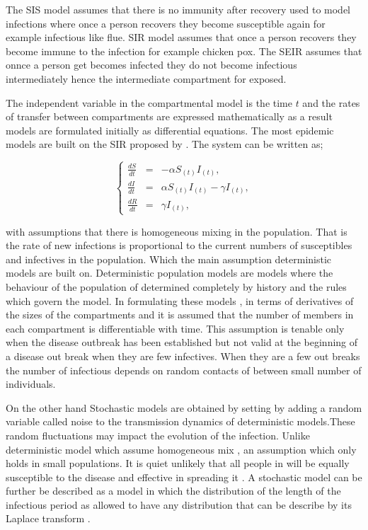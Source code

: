 The SIS model assumes that there is no immunity after recovery used to model infections where once a person recovers they become susceptible again for example infectious like flue. SIR model assumes that once a person recovers they become immune to the infection for example chicken pox. The SEIR assumes that onnce a person get becomes infected they do not  become infectious intermediately hence the intermediate compartment for exposed. 

The independent variable in the compartmental model is the time $t$ and the rates of transfer between compartments are expressed mathematically as a result models are formulated initially as differential equations. The most epidemic models are built on the SIR proposed by \cite{m1925applications}. The system can be written as;


\begin{center}
\begin{equation} \label{eqn1_1}
\left\lbrace \begin{array}{ccl}
\frac{dS}{dt} &= &-\alpha S_{(t)} I_{(t)},\\
 \frac{dI}{dt} &=& \alpha S_{(t)} I_{(t)} - \gamma  I_{(t)}, \\
 \frac{dR}{dt} &= &\gamma  I_{(t)},
\end{array} \right. 
\end{equation}
\end{center}

 with assumptions that there is homogeneous mixing in the population. That is the rate of new infections is proportional to the current numbers of susceptibles and infectives in the population. Which the main assumption deterministic models are built on. Deterministic population  models are models where the behaviour of the population of determined completely by history and the rules which govern the model. In formulating these models , in terms of derivatives of the sizes of the compartments and it is assumed that the number of members in each compartment is differentiable with time. This assumption is tenable only when the disease outbreak has been established  but not valid at the beginning of a disease out break when they are few infectives. When they are a few out breaks the number of infectious depends on random contacts of between small number of individuals.
 
 On the other hand Stochastic models are obtained by setting by adding a random variable called noise to the transmission dynamics of deterministic models.These random fluctuations may impact the evolution of the infection. Unlike deterministic model which assume homogeneous mix , an assumption which only holds in small populations. It is quiet unlikely that all people in will be equally susceptible to the disease and effective in spreading it \citep{ball1985deterministic}. A stochastic model can be further be described as a model in which the distribution of the length of the infectious period as allowed to have any distribution that can be describe by its Laplace transform \citep{addy1991generalized}.
 
